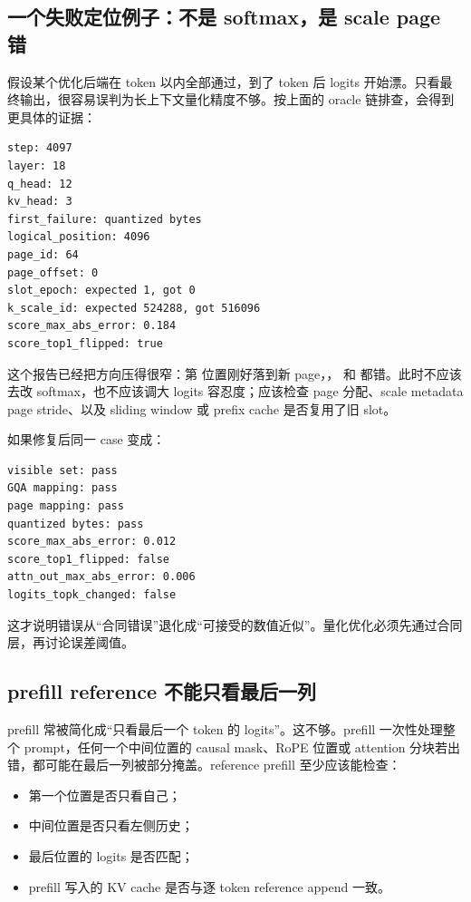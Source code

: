 \subsection{一个失败定位例子：不是 softmax，是 scale page 错}

假设某个优化后端在  token 以内全部通过，到了  token 后 logits 开始漂。只看最终输出，很容易误判为长上下文量化精度不够。按上面的 oracle 链排查，会得到更具体的证据：

\begin{lstlisting}[numbers=none,caption={失败报告示例}]
step: 4097
layer: 18
q_head: 12
kv_head: 3
first_failure: quantized bytes
logical_position: 4096
page_id: 64
page_offset: 0
slot_epoch: expected 1, got 0
k_scale_id: expected 524288, got 516096
score_max_abs_error: 0.184
score_top1_flipped: true
\end{lstlisting}

这个报告已经把方向压得很窄：第  位置刚好落到新 page，， 和  都错。此时不应该去改 softmax，也不应该调大 logits 容忍度；应该检查 page 分配、scale metadata page stride、以及 sliding window 或 prefix cache 是否复用了旧 slot。

如果修复后同一 case 变成：

\begin{lstlisting}[numbers=none,caption={修复后报告应该收敛到数值误差}]
visible set: pass
GQA mapping: pass
page mapping: pass
quantized bytes: pass
score_max_abs_error: 0.012
score_top1_flipped: false
attn_out_max_abs_error: 0.006
logits_topk_changed: false
\end{lstlisting}

这才说明错误从“合同错误”退化成“可接受的数值近似”。量化优化必须先通过合同层，再讨论误差阈值。

\subsection{prefill reference 不能只看最后一列}

prefill 常被简化成“只看最后一个 token 的 logits”。这不够。prefill 一次性处理整个 prompt，任何一个中间位置的 causal mask、RoPE 位置或 attention 分块若出错，都可能在最后一列被部分掩盖。reference prefill 至少应该能检查：

\begin{itemize}
  \item 第一个位置是否只看自己；
  \item 中间位置是否只看左侧历史；
  \item 最后位置的 logits 是否匹配；
  \item prefill 写入的 KV cache 是否与逐 token reference append 一致。
\end{itemize}

